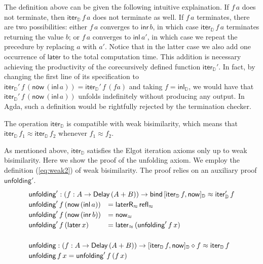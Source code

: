 \documentclass[runningheads]{llncs}
\newcommand{\inl}{\mathsf{inl}}
\newcommand{\inr}{\mathsf{inr}}
\newcommand{\Delay}{\mathsf{Delay}\,}
\newcommand{\now}{\mathsf{now}}
\newcommand{\later}{\mathsf{later}}
\newcommand{\laterR}{\mathsf{laterR}}
\newcommand{\bind}{\mathsf{bind}}
\newcommand{\D}{\mathbb{D}}
\newcommand{\copairD}[2]{[#1,#2]_{\D}}
\newcommand{\inlD}{\mathsf{inl}_{\D}}
\newcommand{\iterD}{\mathsf{iter}_\D}
\newcommand{\unfolding}{\mathsf{unfolding}}
\newcommand{\refl}{\mathsf{refl}}
\begin{document}
The definition above can be given the following intuitive
explaination. If $f\,a$ does not terminate, then $\iterD\,f\,a$ does
not terminate as well. If $f\,a$ terminates, there are two
possibilities: either $f\,a$ converges to $\inr\,b$, in which case
$\iterD\,f\,a$ terminates returning the value $b$; or $f\,a$ converges
to $\inl\,a'$, in which case we repeat the precedure by replacing $a$
with $a'$. Notice that in the latter case we also add one occurrence
of $\later$ to the total computation time. This addition is necessary
achieving the productivity of the corecursively defined function
$\iterD'$. In fact, by changing the first line of its specification to
$\iterD' \,f \,(\now \,(\inl\, a)) = \iterD' \,f \,(f a)$
and taking $f = \inlD$, we would have that $\iterD' \,f \,(\now
\,(\inl\, a))$ unfolds indefinitely without producing any output. In
Agda, such a definition would be rightfully rejected by the termination
checker. 

The operation $\iterD$ is compatible with weak bisimilarity, which means
that $\iterD\,f_1 \approx \iterD\,f_2$ whenever $f_1 \approx f_2$.

As mentioned above, $\iterD$ satisfies the Elgot iteration axioms only
up to weak bisimilarity. Here we show the proof of the unfolding
axiom. We employ the definition (\ref{eq:weak2}) of weak
bisimilarity. The proof relies on an auxiliary proof $\unfolding'$. 
\[
\def\arraystretch{1.2}
\begin{array}{ll}
\multicolumn{2}{l}{\unfolding' : (f : A \to \Delay (A + B)) \to
  \bind\, \copairD{\iterD \,f}{\now} \approx \iterD' \,f} \\
\unfolding' \,f \,(\now \,(\inl \,a)) & = \laterR_{\approx} \,
  \refl_\approx \\
\unfolding' \,f \,(\now \,(\inr \,b)) & = \now_\approx \\
\unfolding' \,f \,(\later \,x) & = \later_\approx \,(\unfolding'\, f\,
  x) \\
 \\
\multicolumn{2}{l}{\unfolding : (f : A \to \Delay (A + B)) \to \copairD{\iterD
  \,f}{\now} \diamond f \approx \iterD \,f}\\
\multicolumn{2}{l}{\unfolding \,f\,x = \unfolding'\,f\,(f\,x)}
\end{array}
\]
\end{document}
